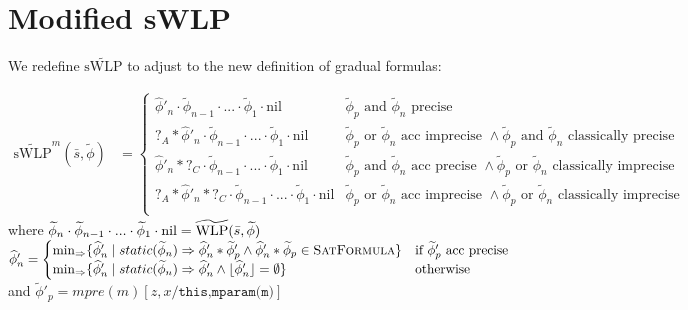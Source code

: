 \documentclass {article}
\newcommand{\fphi}{\widehat{\phi}}
\newcommand{\tphi}{\widetilde{\phi}}
\newcommand{\imp}{\Rightarrow}
\newcommand{\twlp}[2]{\widetilde{\textup{WLP}}(#1,#2)}
\newcommand{\satdef}{\textsc{SatFormula}}
\newcommand{\nil}{\text{nil}}
\begin{document}
\section{Modified sWLP}
We redefine $\widetilde{\text{sWLP}}$ to adjust to the new definition of gradual formulas:
\begin{center}
\begin{align*}
	\widetilde{\text{sWLP}}^m(\bar{s},\tphi) &= 
	\begin{cases}
	\fphi'_n \cdot \tphi_{n-1} \cdot ... \cdot \tphi_1\cdot \nil & \tphi_p\text{ and }\tphi_n\text{ precise }\\
	?_A \ast \fphi'_n \cdot \tphi_{n-1} \cdot ... \cdot \tphi_1\cdot \nil & \tphi_p\text{ or }\tphi_n\text{ acc imprecise } \wedge \tphi_p\text{ and }\tphi_n \text{ classically precise}\\
	\fphi'_n \ast ?_C \cdot \tphi_{n-1} \cdot ... \cdot \tphi_1\cdot \nil & \tphi_p\text{ and }\tphi_n\text{ acc precise } \wedge \tphi_p\text{ or }\tphi_n \text{ classically imprecise}\\
	?_A \ast \fphi'_n \ast ?_C \cdot \tphi_{n-1} \cdot ... \cdot \tphi_1\cdot \nil & \tphi_p\text{ or }\tphi_n\text{ acc imprecise } \wedge \tphi_p\text{ or }\tphi_n \text{ classically imprecise}\\
	\end{cases} 
\end{align*}
where $\tphi_n \cdot \tphi_{n-1} \cdot ... \cdot \tphi_1 \cdot \nil = \twlp{\bar{s}}{\tphi}$\\
$\fphi'_n = \begin{cases} 
\min_{\Rightarrow}\{\fphi'_n \mid static(\tphi_n) \imp \fphi'_n \ast \tphi'_p \wedge \fphi'_n \ast \tphi_p \in \satdef\} &\textup{if } \tphi'_p \textup{ acc precise}\\
\min_{\Rightarrow}\{\fphi'_n \mid  static(\tphi_n) \imp \fphi'_n\wedge \lfloor \fphi'_n \rfloor = \emptyset\} &\textup{otherwise}
\end{cases}$\\
and $\tphi'_p = mpre(m)[z,x/\texttt{this,mparam(m)}]$\\

\end{center}
\end{document}
